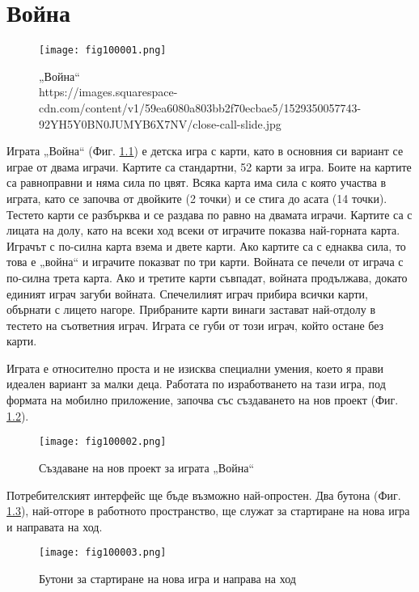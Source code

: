 ﻿\chapter{Война}

\begin{figure}[H]
  \centering
  \texttt{[image: fig100001.png]}
  \caption{„Война“ \\ https://images.squarespace-cdn.com/content/v1/59ea6080a803bb2f70ecbae5/1529350057743-92YH5Y0BN0JUMYB6X7NV/close-call-slide.jpg}
\label{fig100001}
\end{figure}

Играта „Война“ (Фиг. \ref{fig100001}) е детска игра с карти, като в основния си вариант се играе от двама играчи. Картите са стандартни, 52 карти за игра. Боите на картите са равноправни и няма сила по цвят. Всяка карта има сила с която участва в играта, като се започва от двойките (2 точки) и се стига до асата (14 точки). Тестето карти се разбърква и се раздава по равно на двамата играчи. Картите са с лицата на долу, като на всеки ход всеки от играчите показва най-горната карта. Играчът с по-силна карта взема и двете карти. Ако картите са с еднаква сила, то това е „война“ и играчите показват по три карти. Войната се печели от играча с по-силна трета карта. Ако и третите карти съвпадат, войната продължава, докато единият играч загуби войната. Спечелилият играч прибира всички карти, обърнати с лицето нагоре. Прибраните карти винаги застават най-отдолу в тестето на съответния играч. Играта се губи от този играч, който остане без карти. 

Играта е относително проста и не изисква специални умения, което я прави идеален вариант за малки деца. Работата по изработването на тази игра, под формата на мобилно приложение, започва със създаването на нов проект (Фиг. \ref{fig100002}).

\begin{figure}[H]
  \centering
  \texttt{[image: fig100002.png]}
  \caption{Създаване на нов проект за играта „Война“}
\label{fig100002}
\end{figure}

Потребителският интерфейс ще бъде възможно най-опростен. Два бутона (Фиг. \ref{fig100003}), най-отгоре в работното пространство, ще служат за стартиране на нова игра и направата на ход.

\begin{figure}[H]
  \centering
  \texttt{[image: fig100003.png]}
  \caption{Бутони за стартиране на нова игра и направа на ход}
\label{fig100003}
\end{figure}

